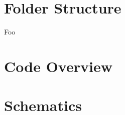\clearpage
\begin{appendices}
	
\chapter{Folder Structure} \label{sec:folder-struct}

Foo


\chapter{ Code Overview}

	
	
\chapter{Schematics}

\end{appendices}